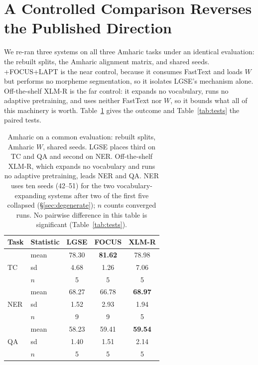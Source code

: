 \documentclass[11pt]{article}
\begin{document}
\section{A Controlled Comparison Reverses the Published Direction}
\label{sec:controlled}

We re-ran three systems on all three Amharic tasks under an identical
evaluation: the rebuilt splits, the Amharic alignment matrix, and shared
seeds. \textsc{+FOCUS+LAPT} is the near control, because it consumes
FastText and loads $W$ but performs no morpheme segmentation, so it isolates
LGSE's mechanism alone. Off-the-shelf XLM-R is the far control: it expands no
vocabulary, runs no adaptive pretraining, and uses neither FastText nor $W$,
so it bounds what all of this machinery is worth. Table~\ref{tab:controlled}
gives the outcome and Table~\ref{tab:tests} the paired tests.

\begin{table}[t]
\centering
\small
\begin{tabular}{llccc}
\toprule
Task & Statistic & LGSE & FOCUS & XLM-R \\
\midrule
\multirow{3}{*}{TC}
 & mean & 78.30 & \textbf{81.62} & 78.98 \\
 & sd   & 4.68  & 1.26  & 7.06 \\
 & $n$  & 5     & 5     & 5 \\
\midrule
\multirow{3}{*}{NER}
 & mean & 68.27 & 66.78 & \textbf{68.97} \\
 & sd   & 1.52  & 2.93  & 1.94 \\
 & $n$  & 9     & 9     & 5 \\
\midrule
\multirow{3}{*}{QA}
 & mean & 58.23 & 59.41 & \textbf{59.54} \\
 & sd   & 1.40  & 1.51  & 2.14 \\
 & $n$  & 5     & 5     & 5 \\
\bottomrule
\end{tabular}
\caption{Amharic on a common evaluation: rebuilt splits, Amharic $W$, shared
seeds. LGSE places third on TC and QA and second on NER. Off-the-shelf
XLM-R, which expands no vocabulary and runs no adaptive pretraining, leads
NER and QA. NER uses ten seeds (42--51) for the two vocabulary-expanding
systems after two of the first five collapsed
(\S\ref{sec:degenerate}); $n$ counts converged runs. No pairwise difference
in this table is significant (Table~\ref{tab:tests}).}
\label{tab:controlled}
\end{table}
\end{document}
